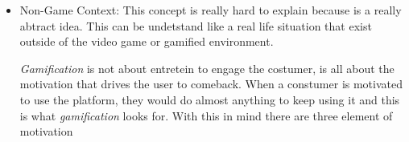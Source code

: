 \begin{itemize}
\item Non-Game Context: This concept is really hard to explain because is a really
abtract idea. This can be undetstand like a real life situation that exist  outside
 of the video game or gamified environment.

\emph{Gamification} is not about entretein to engage the costumer, is all about the 
motivation that drives the user to comeback. When a constumer is motivated to use the 
platform, they would do almost anything to keep using it and this is what 
\emph{gamification} looks for. 
With this in mind there are three element of motivation  



\end{itemize}

